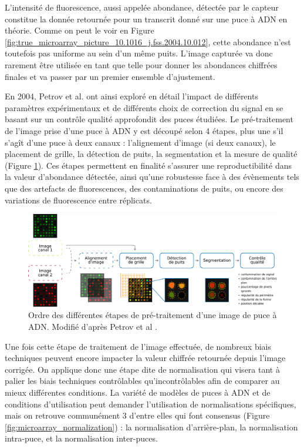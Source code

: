 L'intensité de fluorescence, aussi appelée abondance, détectée par le capteur constitue la donnée retournée pour un transcrit donné sur une puce à ADN en théorie. Comme on peut le voir en Figure \ref{fig:true_microarray_picture_10.1016_j.fss.2004.10.012}, cette abondance n'est toutefois pas uniforme au sein d'un même puits. L'image capturée va donc rarement être utilisée en tant que telle pour donner les abondances chiffrées finales et va passer par un premier ensemble d'ajustement.

En 2004, Petrov et al. \cite{Petrov2004Nov} ont ainsi exploré en détail l'impact de différents paramètres expérimentaux et de différents choix de correction du signal en se basant sur un contrôle qualité approfondit des puces étudiées. Le pré-traitement de l'image prise d'une puce à ADN y est découpé selon 4 étapes, plus une s'il s'agît d'une puce à deux canaux : l'alignement d'image (si deux canaux), le placement de grille, la détection de puits, la segmentation et la mesure de qualité (Figure \ref{fig:microarray_image_preprocessing}). Ces étapes permettent en finalité s'assurer une reproductibilité dans la valeur d'abondance détectée, ainsi qu'une robustesse face à des évènements tels que des artefacts de fluorescences, des contaminations de puits, ou encore des variations de fluorescence entre réplicats.

\begin{figure}[!h]
    \centering
    \includegraphics[width=\textwidth]{img/intro/microarray_image_preprocessing.pdf}
    \caption{Ordre des différentes étapes de pré-traitement d'une image de puce à ADN. Modifié d'après Petrov et al \cite{Petrov2004Nov}.}
    \label{fig:microarray_image_preprocessing}
\end{figure}

Une fois cette étape de traitement de l'image effectuée, de nombreux biais techniques peuvent encore impacter la valeur chiffrée retournée depuis l'image corrigée. On applique donc une étape dite de normalisation qui visera tant à palier les biais techniques contrôlables qu'incontrôlables afin de comparer au mieux différentes conditions. La variété de modèles de puces à ADN et de conditions d'utilisation peut demander l'utilisation de normalisations spécifiques, mais on retrouve communément 3 d'entre elles qui font consensus \cite{Smyth2003Dec} (Figure \ref{fig:microarray_normalization}) : la normalisation d'arrière-plan, la normalisation intra-puce, et la normalisation inter-puces.

